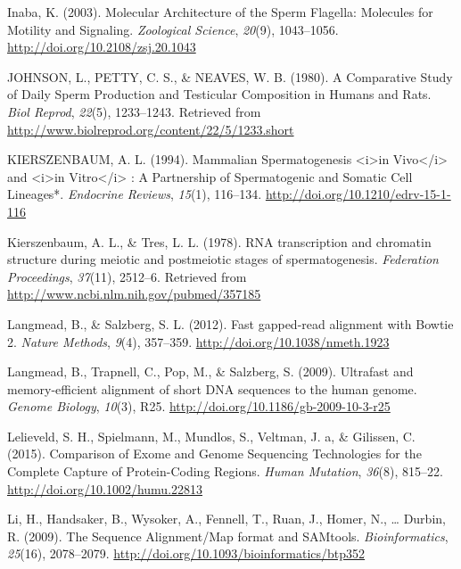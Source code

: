\documentclass[12pt,twoside]{reedthesis}
\theoremstyle{definition}
\theoremstyle{definition}
\theoremstyle{remark}
\begin{document}
  \hypertarget{ref-Inaba2003}{}
  Inaba, K. (2003). Molecular Architecture of the Sperm Flagella:
  Molecules for Motility and Signaling. \emph{Zoological Science},
  \emph{20}(9), 1043--1056. \url{http://doi.org/10.2108/zsj.20.1043}
  
  \hypertarget{ref-Johnson1980}{}
  JOHNSON, L., PETTY, C. S., \& NEAVES, W. B. (1980). A Comparative Study
  of Daily Sperm Production and Testicular Composition in Humans and Rats.
  \emph{Biol Reprod}, \emph{22}(5), 1233--1243. Retrieved from
  \url{http://www.biolreprod.org/content/22/5/1233.short}
  
  \hypertarget{ref-KIERSZENBAUM1994}{}
  KIERSZENBAUM, A. L. (1994). Mammalian Spermatogenesis
  \textless{}i\textgreater{}in Vivo\textless{}/i\textgreater{} and
  \textless{}i\textgreater{}in Vitro\textless{}/i\textgreater{} : A
  Partnership of Spermatogenic and Somatic Cell Lineages*. \emph{Endocrine
  Reviews}, \emph{15}(1), 116--134.
  \url{http://doi.org/10.1210/edrv-15-1-116}
  
  \hypertarget{ref-Kierszenbaum1978}{}
  Kierszenbaum, A. L., \& Tres, L. L. (1978). RNA transcription and
  chromatin structure during meiotic and postmeiotic stages of
  spermatogenesis. \emph{Federation Proceedings}, \emph{37}(11), 2512--6.
  Retrieved from \url{http://www.ncbi.nlm.nih.gov/pubmed/357185}
  
  \hypertarget{ref-Langmead2012}{}
  Langmead, B., \& Salzberg, S. L. (2012). Fast gapped-read alignment with
  Bowtie 2. \emph{Nature Methods}, \emph{9}(4), 357--359.
  \url{http://doi.org/10.1038/nmeth.1923}
  
  \hypertarget{ref-Langmead2009}{}
  Langmead, B., Trapnell, C., Pop, M., \& Salzberg, S. (2009). Ultrafast
  and memory-efficient alignment of short DNA sequences to the human
  genome. \emph{Genome Biology}, \emph{10}(3), R25.
  \url{http://doi.org/10.1186/gb-2009-10-3-r25}
  
  \hypertarget{ref-Lelieveld2015}{}
  Lelieveld, S. H., Spielmann, M., Mundlos, S., Veltman, J. a, \&
  Gilissen, C. (2015). Comparison of Exome and Genome Sequencing
  Technologies for the Complete Capture of Protein-Coding Regions.
  \emph{Human Mutation}, \emph{36}(8), 815--22.
  \url{http://doi.org/10.1002/humu.22813}
  
  \hypertarget{ref-Li2009}{}
  Li, H., Handsaker, B., Wysoker, A., Fennell, T., Ruan, J., Homer, N.,
  \ldots{} Durbin, R. (2009). The Sequence Alignment/Map format and
  SAMtools. \emph{Bioinformatics}, \emph{25}(16), 2078--2079.
  \url{http://doi.org/10.1093/bioinformatics/btp352}
  
\end{document}
